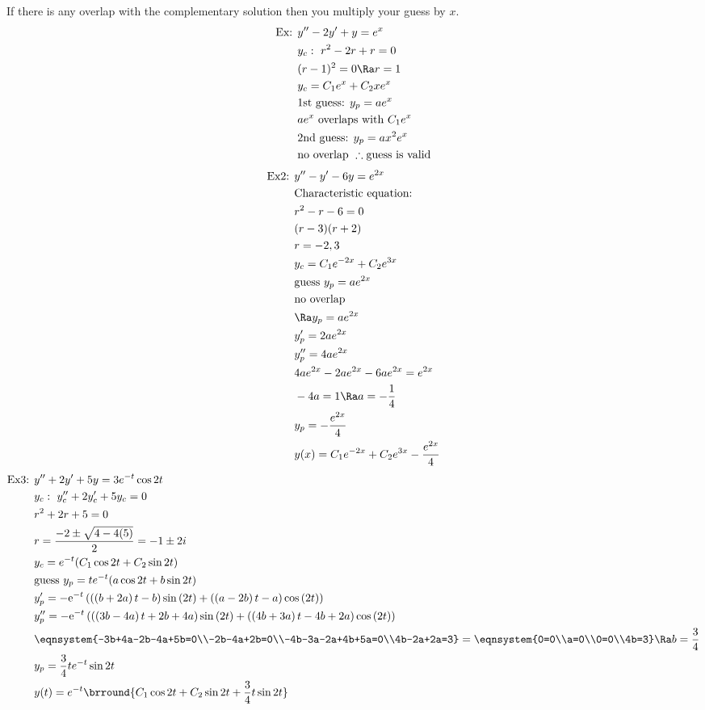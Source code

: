 If there is any overlap with the complementary solution then you multiply your guess by $x$.
\begin{align*}
    \text{Ex: }&y''-2y'+y=e^x\\
    &y_c:\ r^2-2r+r=0\\
    &(r-1)^2=0\Ra r=1\\
    &y_c=C_1e^x+C_2xe^x\\
    &\text{1st guess: }y_p=ae^x\\
    &ae^x\text{ overlaps with }C_1e^x\\
    &\text{2nd guess: }y_p=ax^2e^x\\
    &\text{no overlap }\therefore\text{guess is valid}
\end{align*}
\begin{align*}
    \text{Ex2: }&y''-y'-6y=e^{2x}\\
    &\text{Characteristic equation:}\\
    &r^2-r-6=0\\
    &(r-3)(r+2)\\
    &r=-2,3\\
    &y_c=C_1e^{-2x}+C_2e^{3x}\\
    &\text{guess }y_p=ae^{2x}\\
    &\text{no overlap }\\
    &\Ra y_p=ae^{2x}\\
    &y_p'=2ae^{2x}\\
    &y_p''=4ae^{2x}\\
    &4ae^{2x}-2ae^{2x}-6ae^{2x}=e^{2x}\\
    &-4a=1\Ra a=-\frac{1}{4}\\
    &y_p=-\frac{e^{2x}}{4}\\
    &y(x)=C_1e^{-2x}+C_2e^{3x}-\frac{e^{2x}}{4}
\end{align*}
\begin{align*}
    \text{Ex3: }&y''+2y'+5y=3e^{-t}\cos2t\\
    &y_c:\ y_c''+2y_c'+5y_c=0\\
    &r^2+2r+5=0\\
    &r=\frac{-2\pm\sqrt{4-4(5)}}{2}=-1\pm2i\\
    &y_c=e^{-t}(C_1\cos2t+C_2\sin2t)\\
    &\text{guess }y_p=te^{-t}(a\cos2t+b\sin2t)\\
    &y_p'=-\mathrm{e}^{-t}\left(\left(\left(b+2a\right)t-b\right)\sin\left(2t\right)+\left(\left(a-2b\right)t-a\right)\cos\left(2t\right)\right)\\
    &y_p''=-\mathrm{e}^{-t}\left(\left(\left(3b-4a\right)t+2b+4a\right)\sin\left(2t\right)+\left(\left(4b+3a\right)t-4b+2a\right)\cos\left(2t\right)\right)\\
    &\eqnsystem{-3b+4a-2b-4a+5b=0\\-2b-4a+2b=0\\-4b-3a-2a+4b+5a=0\\4b-2a+2a=3}=\eqnsystem{0=0\\a=0\\0=0\\4b=3}\Ra b=\frac{3}{4}\\
    &y_p=\frac{3}{4}te^{-t}\sin2t\\
    &y(t)=e^{-t}\brround{C_1\cos2t+C_2\sin2t+\frac{3}{4}t\sin2t}
\end{align*}
